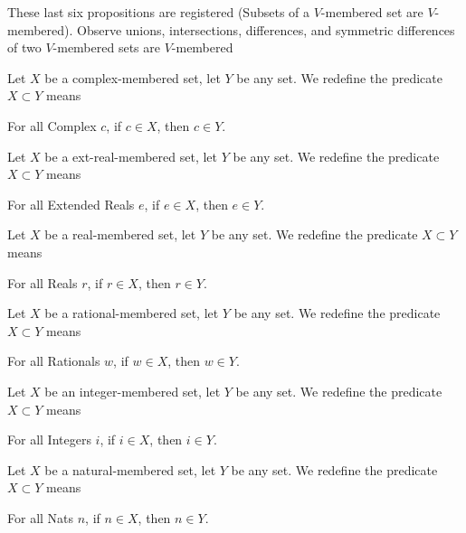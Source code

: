 \documentclass{article}
\begin{document}
These last six propositions are registered (Subsets of a $V$-membered
set are $V$-membered). Observe unions, intersections, differences, and
symmetric differences of two $V$-membered sets
are $V$-membered

\begin{definition}
Let $X$ be a complex-membered set, let $Y$ be any set.
We redefine the predicate $X\subset Y$ means
\begin{defn}
\item For all Complex $c$, if $c\in X$, then $c\in Y$.
\end{defn}
\end{definition}

\begin{definition}
Let $X$ be a ext-real-membered set, let $Y$ be any set.
We redefine the predicate $X\subset Y$ means
\begin{defn}
\item For all Extended Reals $e$, if $e\in X$, then $e\in Y$.
\end{defn}
\end{definition}

\begin{definition}
Let $X$ be a real-membered set, let $Y$ be any set.
We redefine the predicate $X\subset Y$ means
\begin{defn}
\item For all Reals $r$, if $r\in X$, then $r\in Y$.
\end{defn}
\end{definition}

\begin{definition}
Let $X$ be a rational-membered set, let $Y$ be any set.
We redefine the predicate $X\subset Y$ means
\begin{defn}
\item For all Rationals $w$, if $w\in X$, then $w\in Y$.
\end{defn}
\end{definition}

\begin{definition}
Let $X$ be an integer-membered set, let $Y$ be any set.
We redefine the predicate $X\subset Y$ means
\begin{defn}
\item For all Integers $i$, if $i\in X$, then $i\in Y$.
\end{defn}
\end{definition}

\begin{definition}
Let $X$ be a natural-membered set, let $Y$ be any set.
We redefine the predicate $X\subset Y$ means
\begin{defn}
\item For all Nats $n$, if $n\in X$, then $n\in Y$.
\end{defn}
\end{definition}
\end{document}
